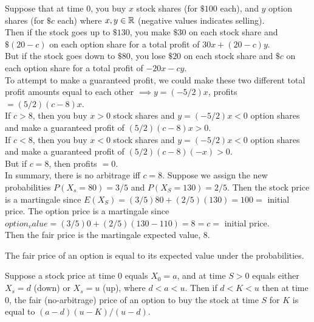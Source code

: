 \documentclass[11pt]{article}
\begin{document}
   	Suppose that at time 0, you buy $x$ stock shares (for $\$100$ each), and $y$ option shares (for $\$ c$ each) where $x, y \in \mathbb{R}$ (negative values indicates selling).\\
   	Then if the stock goes up to $\$130$, you make $\$30$ on each stock share and $\$(20-c)$ on each option share for a total profit of $30x + (20-c) y$.\\
   	But if the stock goes down to $\$80$, you lose $\$20$ on each stock share and $\$c$ on each option share for a total profit of $-20x - cy$.\\
   	To attempt to make a guaranteed profit, we could make these two different total profit amounts equal to each other $\implies y = (-5/2)x$, profits $= (5/2)(c-8)x$.\\
   	If $c > 8$, then you buy $x > 0$ stock shares and $y = (-5/2)x < 0$ option shares and make a guaranteed profit of $(5/2)(c-8)x>0$.\\
   	If $c < 8$, then you buy $x < 0$ stock shares and $y = (-5/2)x < 0$ option shares and make a guaranteed profit of $(5/2)(c-8)(-x)>0$.\\   	
   	But if $c=8$, then profits $=0$.\\
   	In summary, there is no arbitrage iff $c = 8$.
   	\example
   	Suppose we assign the new probabilities $P(X_s = 80) = 3/5$ and $P(X_S = 130) = 2/5$. Then the stock price is a martingale since $E(X_S) = (3/5)80 + (2/5)(130) = 100 = $ initial price. The option price is a martingale since $option_value = (3/5)0 + (2/5)(130 - 110) = 8 = c = $ initial price.  \\
   	Then the fair price is the martingale expected value, 8. 
    
    
     The fair price of an option is equal to its expected value under the  probabilities.
    
    \proposition Suppose a stock price at time 0 equals $X_0 = a$, and at time $S > 0$ equals either $X_s = d$ (down) or $X_s = u$ (up), where $d < a < u$. Then if $d < K < u$ then at time 0, the fair (no-arbitrage) price of an option to buy the stock at time $S$ for $K$ is equal to $(a-d)(u-K)/(u-d)$.
    
    
    
    
    
    
    
\end{document}
